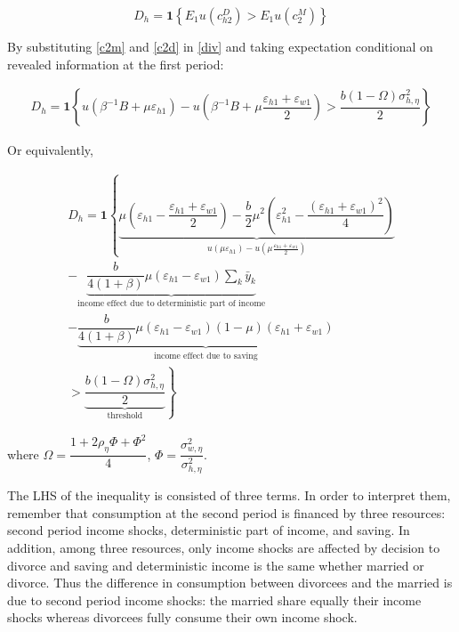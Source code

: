 \begin{equation}
D_h = \mathbf 1 \left \{ E_1 u(c_{h2}^D) > E_1 u(c_2^M) \right \}
\label{div}
\end{equation}

\noindent By substituting \eqref{c2m} and \eqref{c2d}  in \eqref {div} and taking expectation conditional on revealed information at the first period:

\begin{align*}
D_h = \mathbf 1 \left \{u(\beta^{-1}B + \mu \varepsilon_{h1}) - u(\beta^{-1}B + \mu \dfrac{\varepsilon_{h1} + \varepsilon_{w1}}{2}) > \dfrac{b  (1- \Omega )\sigma^2_{h,\eta}}{2} \right \}
\end{align*}

Or equivalently, 

\begin{align}
D_h = \mathbf  1  \left  \{ \underbrace{  \mu (\varepsilon_{h1} - \dfrac{\varepsilon_{h1} + \varepsilon_{w1}}{2} ) - \dfrac{b}{2} \mu^2 (\varepsilon^2_{h1} - \dfrac{(\varepsilon_{h1} + \varepsilon_{w1})^2}{4})}_{u(\mu \varepsilon_{h1}) - u(\mu \frac{\varepsilon_{h1} + \varepsilon_{w1}}{2})} \right. \nonumber \\
\left.   - \underbrace{  \dfrac{b }{4(1+\beta)}  \mu (\varepsilon_{h1} - \varepsilon_{w1})   \sum_k \bar y_k }_{\text{income effect due to deterministic part of income}}\right. \nonumber \\
\left.   -  \underbrace{\dfrac{b }{4(1+\beta)} \mu (\varepsilon_{h1} - \varepsilon_{w1}) (1-\mu) (\varepsilon_{h1} + \varepsilon_{w1})}_{\text{income effect due to saving}}  \right.  \nonumber \\ 
 \left.     >  \underbrace{\dfrac{b  (1- \Omega )\sigma^2_{h,\eta}}{2}}_{\text{threshold}}   \right \}
\end{align}

 where  $\Omega = \dfrac{1 + 2\rho_\eta \Phi+ \Phi^2}{4}$, $\Phi = \dfrac{\sigma^2_{w,\eta}}{\sigma^2_{h,\eta}}$. %

The LHS of the inequality is consisted of three terms. In order to interpret them, remember that consumption at the second period is financed by three resources: second period income shocks, deterministic part of income, and saving. In addition, among three resources, only income shocks are affected by decision to divorce and saving and deterministic income is the same whether married or divorce. Thus the difference in consumption between divorcees and the married is due to second period income shocks: the married share equally their income shocks whereas divorcees fully consume their own income shock. \\

